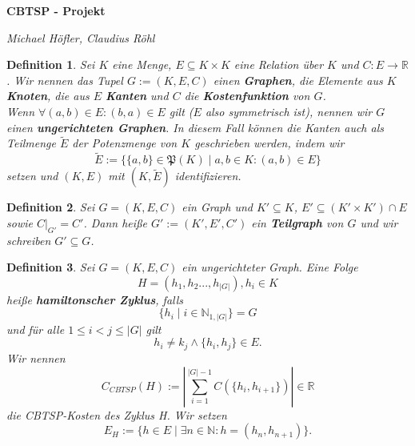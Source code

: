 \documentclass[10pt,oneside,a4paper]{report}
\newcommand{\nat}{\mathbb{N}}
\newcommand{\pot}[1]{\mathfrak{P}(#1)}
\newtheorem{Def}{Definition}
\begin{document}
	\begin{center}
		\textbf{CBTSP - Projekt}
		
		\textit{Michael Höfler, Claudius Röhl}
	\end{center}

\begin{Def}  
	Sei $K$ eine Menge, $E\subseteq K\times K$ eine Relation über $K$ und $C:E\to\mathbb{R}$.  Wir nennen das Tupel $G:=(K,E,C)$ einen \textbf{Graphen}, die Elemente aus $K$ \textbf{Knoten}, die aus $E$ \textbf{Kanten} und $C$ die \textbf{Kostenfunktion} von $G$. \\
	
	\noindent Wenn $\forall (a,b)\in E: (b,a)\in E$ gilt ($E$ also symmetrisch ist), nennen wir $G$  einen \textbf{ungerichteten Graphen}. In diesem Fall können die Kanten auch als Teilmenge $\tilde{E}$ der Potenzmenge von $K$ geschrieben werden, indem wir 
	$$\tilde{E}:=\{\{a,b\}\in \pot{K}\mid a,b\in K: (a,b)\in E\}$$
	setzen und $(K,E)$ mit $(K,\tilde{E})$ identifizieren.
\end{Def}

\begin{Def} 
	Sei $G=(K,E,C)$ ein Graph und $K'\subseteq K$, $E'\subseteq (K'\times K')\cap E$ sowie $C|_{G'}=C'$. Dann heiße $G':=(K',E',C')$ ein \textbf{Teilgraph} von $G$ und wir schreiben $G'\subseteq G$.
\end{Def}

\begin{Def} 
	Sei $G=(K,E,C)$ ein ungerichteter Graph. Eine Folge 
	$$H=(h_1,h_2...,h_{|G|}), h_i \in K$$
	heiße \textbf{hamiltonscher Zyklus}, falls
	$$\{ h_i \mid i\in\nat_{1,|G|}\} = G$$ und
	für alle $1\leq i<j\leq |G|$ gilt
	$$ h_i\neq k_j \wedge \{h_i,h_j\}\in E.$$
	Wir nennen
	$$C_{CBTSP}(H):=\left|\sum_{i = 1}^{|G|-1}C(\{h_i,h_{i+1}\})\right|\in \mathbb{R}$$
	die CBTSP-Kosten des Zyklus H.
	Wir setzen 
	$$E_H := \{h\in E\mid \exists n\in \nat: h=(h_n,h_{n+1})\}.$$
\end{Def}
\end{document}
